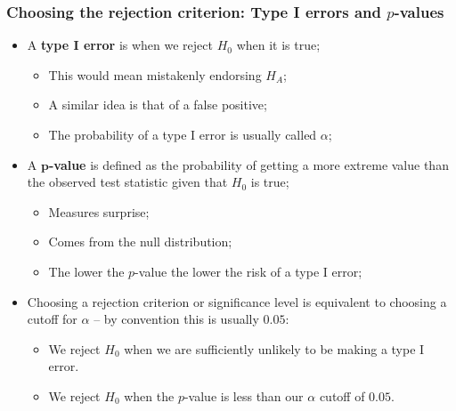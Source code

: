 \documentclass[aspectratio=169]{beamer}
\theoremstyle{principle}
\begin{document}
\begin{frame}
\frametitle{Choosing the rejection criterion: Type I errors and $p$-values}

\begin{itemize}
\item A \textbf{type I error} is when we reject $H_0$ when it is true;
\begin{itemize}
\item This would mean mistakenly endorsing $H_A$;
\item A similar idea is that of a false positive;
\item The probability of a type I error is usually called $\alpha$;
\end{itemize}
\bigskip
\bigskip

\item A $\mathbf{p}$\textbf{-value} is defined as the probability of getting a more extreme value than the observed test statistic given that $H_0$ is true;
\begin{itemize}
\item Measures surprise;
\item Comes from the null distribution;
\item The lower the $p$-value the lower the risk of a type I error;
\end{itemize}
\bigskip
\bigskip

\item[]\color{white} Choosing a rejection criterion or significance level is equivalent to choosing a cutoff for $\alpha$ -- by convention this is usually $0.05$:
\begin{itemize}
\item[]\color{white} We reject $H_0$ when we are sufficiently unlikely to be making a type I error.
\item[]\color{white} We reject $H_0$ when the $p$-value is less than our $\alpha$ cutoff of $0.05$.
\end{itemize}
\end{itemize}

\end{frame}
\end{document}

